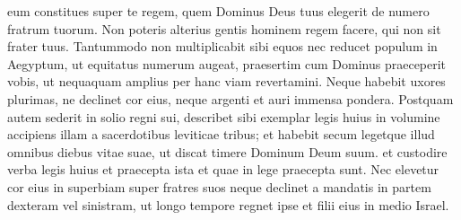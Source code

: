 \begin{biblechapter}
\begin{biblechapter}
\begin{biblechapter}
\begin{biblechapter}
\begin{biblechapter}
\begin{biblechapter}
\begin{biblechapter}
\begin{biblechapter}
\begin{biblechapter}
\begin{biblechapter}
\begin{biblechapter}
\begin{biblechapter}
\begin{biblechapter}
\begin{biblechapter}
\begin{biblechapter}
\begin{biblechapter}
\begin{biblechapter}
\verse eum constitues super te regem, quem Dominus Deus tuus elegerit de numero fratrum tuorum. Non poteris alterius gentis hominem regem facere, qui non sit frater tuus.
 \verse Tantummodo non multiplicabit sibi equos nec reducet populum in Aegyptum, ut equitatus numerum augeat, praesertim cum Dominus praeceperit vobis, ut nequaquam amplius per hanc viam revertamini. 
\verse Neque habebit uxores plurimas, ne declinet cor eius, neque argenti et auri immensa pondera. 
\verse Postquam autem sederit in solio regni sui, describet sibi exemplar legis huius in volumine accipiens illam a sacerdotibus leviticae tribus; 
\verse et habebit secum legetque illud omnibus diebus vitae suae, ut discat timere Dominum Deum suum. et custodire verba legis huius et praecepta ista et quae in lege praecepta sunt. 
 \verse Nec elevetur cor eius in superbiam super fratres suos neque declinet a mandatis in partem dexteram vel sinistram, ut longo tempore regnet ipse et filii eius in medio Israel.
 

\end{biblechapter}
\end{biblechapter}
\end{biblechapter}
\end{biblechapter}
\end{biblechapter}
\end{biblechapter}
\end{biblechapter}
\end{biblechapter}
\end{biblechapter}
\end{biblechapter}
\end{biblechapter}
\end{biblechapter}
\end{biblechapter}
\end{biblechapter}
\end{biblechapter}
\end{biblechapter}
\end{biblechapter}
